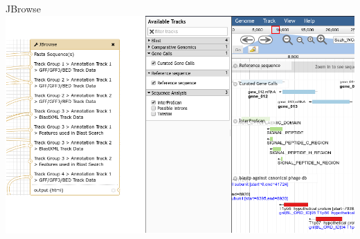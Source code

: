 \documentclass[12pt]{beamer}
\begin{document}
\begin{frame}{JBrowse}
    \centering
    \includegraphics[width=\textwidth]{./jigc.png}
\end{frame}
\end{document}

